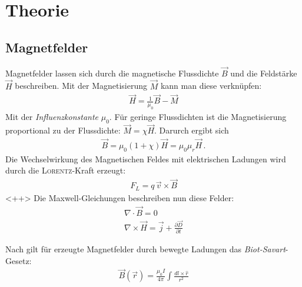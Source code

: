 \documentclass[12pt,a4paper,titlepage,headinclude,bibtotoc]{scrartcl}
\begin{document}
\section{Theorie}
\label{sec:theorie}
\subsection{Magnetfelder}
Magnetfelder lassen sich durch die magnetische Flussdichte $\vec B$ und die Feldstärke $\vec H$ beschreiben.
Mit der Magnetisierung $\vec M$ kann man diese verknüpfen:
\begin{align}
	\vec H=\frac 1{\mu_0}\vec B-\vec M
\end{align}
Mit der \emph{Influenzkonstante} $\mu_0$.
Für geringe Flussdichten ist die Magnetisierung proportional zu der Flussdichte: $\vec M=\chi\vec H$.
Darurch ergibt sich
\begin{align}
	\vec B=\mu_0(1+\chi )\vec H=\mu_0\mu_r\vec H\, .
\end{align}
Die Wechselwirkung des Magnetischen Feldes mit elektrischen Ladungen wird durch die \textsc{Lorentz}-Kraft erzeugt:
\begin{align}
	F_L=q\,\vec v\times \vec B
\end{align}<++>
Die Maxwell-Gleichungen beschreiben nun diese Felder:
\begin{align}
	\nabla\cdot\vec B=0\\
	\nabla\times\vec H=\vec j+\frac{\partial \vec D}{\partial t}
\end{align}

Nach \cite[S.215]{griffith} gilt für erzeugte Magnetfelder durch bewegte Ladungen das \emph{Biot-Savart}-Gesetz:
\begin{align}
	\vec B(\vec r)=\frac{\mu_0 I}{4\pi}\int\frac{dl\times \hat r}{r^2}\label{eq:Biot}
\end{align}
\end{document}
